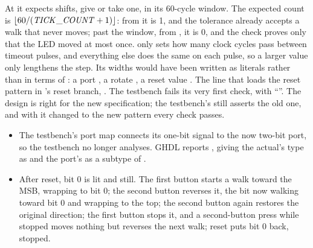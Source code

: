 At  it expects  shifts, give or take one, in its
60-cycle window. The expected count is $\lfloor 60 / (\mathit{TICK\_COUNT} + 1) \rfloor$: from
 it is 1, and the tolerance already accepts a walk that never moves; past the
window, from , it is 0, and the check proves only that the LED moved at most
once.  only sets how many clock cycles pass between timeout pulses, and everything
else does the same on each pulse, so a larger value only lengthens the step.
Its widths would have been written as literals rather than in terms of : a
port , a rotate , a
reset value .
The line that loads the reset pattern in 's reset branch,
. The testbench fails its very first check, with
``''.
The design is right for the new specification; the testbench's  still asserts
the old one, and with it changed to the new pattern every check passes.

\begin{itemize}
  \item The testbench's port map connects its one-bit  signal  to
    the now two-bit port, so the testbench no longer analyses. GHDL reports
    , giving the actual's type as
     and the port's as a subtype of .
  \item After reset, bit 0 is lit and still. The first button starts a walk toward the MSB,
    wrapping to bit 0; the second button reverses it, the bit now walking toward bit 0 and wrapping
    to the top; the second button again restores the original direction; the first button stops
    it, and a second-button press while stopped moves nothing but reverses the next walk; reset
    puts bit 0 back, stopped.
\end{itemize}
